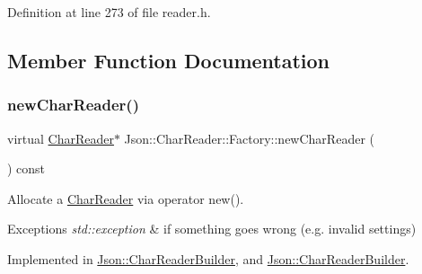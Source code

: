 Definition at line 273 of file reader.\+h.



\subsection{Member Function Documentation}
\hypertarget{class_json_1_1_char_reader_1_1_factory_a4c5862a1ffd432372dbe65cf59de98c4}{}\label{class_json_1_1_char_reader_1_1_factory_a4c5862a1ffd432372dbe65cf59de98c4} 
\subsubsection{\texorpdfstring{new\+Char\+Reader()}{newCharReader()}\hspace{0.1cm}{\footnotesize\ttfamily [1/2]}}
{\footnotesize\ttfamily virtual \hyperlink{class_json_1_1_char_reader}{Char\+Reader}$\ast$ Json\+::\+Char\+Reader\+::\+Factory\+::new\+Char\+Reader (\begin{DoxyParamCaption}{ }\end{DoxyParamCaption}) const\hspace{0.3cm}{\ttfamily [pure virtual]}}



Allocate a \hyperlink{class_json_1_1_char_reader}{Char\+Reader} via operator new(). 


\begin{DoxyExceptions}{Exceptions}
{\em std\+::exception} & if something goes wrong (e.\+g. invalid settings) \\
\hline
\end{DoxyExceptions}


Implemented in \hyperlink{class_json_1_1_char_reader_builder_a3a262fcc76c1eb8eebfd4718fb4e9722}{Json\+::\+Char\+Reader\+Builder}, and \hyperlink{class_json_1_1_char_reader_builder_ab14c54e438007a57c1acbd6e7459d4d0}{Json\+::\+Char\+Reader\+Builder}.

\hypertarget{class_json_1_1_char_reader_1_1_factory_a4c5862a1ffd432372dbe65cf59de98c4}{}\label{class_json_1_1_char_reader_1_1_factory_a4c5862a1ffd432372dbe65cf59de98c4} 
